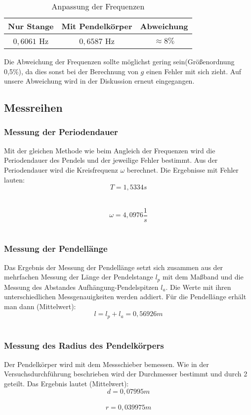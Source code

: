 \documentclass[a4paper, 11pt]{article}
\begin{document}
\begin{table}[H]
	\large
	\centering
	\begin{tabular}{|c|c|c|}
		\hline 	Nur Stange & Mit Pendelkörper &	Abweichung \\
		\hline	$0,6061$ Hz	&	$0,6587$ Hz		&	$\approx 8\%$ \\
		\hline
	\end{tabular}
	\caption{Anpassung der Frequenzen}
	\label{table:lin_Bereich}
\end{table}
 
Die Abweichung der Frequenzen sollte möglichst gering sein(Größenordnung 0,5\%), da dies sonst bei der Berechnung von $g$ einen Fehler mit sich zieht. Auf unsere Abweichung wird in der Diskussion erneut eingegangen. 

\subsection{Messreihen}
\subsubsection{Messung der Periodendauer}
Mit der gleichen Methode wie beim Angleich der Frequenzen wird die Periodendauer des Pendels und der jeweilige Fehler bestimmt. Aus der Periodendauer wird die Kreisfrequenz $\omega$ berechnet. Die Ergebnisse mit Fehler lauten:
\\
\begin{equation*}
T = 1,5334s
\end{equation*}\

\begin{equation*}
\omega = 4,0976 \frac{1}{s}
\end{equation*}\


\subsubsection{Messung der Pendellänge}
Das Ergebnis der Messung der Pendellänge setzt sich zusammen aus der mehrfachen Messung der Länge der Pendelstange $l_p$ mit dem Maßband und die Messung des Abstandes Aufhängung-Pendelspitzen $l_a$. Die Werte mit ihren unterschiedlichen Messgenauigkeiten werden addiert. Für die Pendellänge erhält man dann (Mittelwert):
\\
\begin{equation*}
l = l_p + l_a = 0,56926m
\end{equation*}\

\subsubsection{Messung des Radius des Pendelkörpers}
Der Pendelkörper wird mit dem Messschieber bemessen. Wie in der Versuchsdurchführung beschrieben wird der Durchmesser bestimmt und durch 2 geteilt. Das Ergebnis lautet (Mittelwert):
\\
\begin{equation*}
d = 0,07995m
\end{equation*}\
\begin{equation*}
r = 0,039975m
\end{equation*}\
\end{document}
